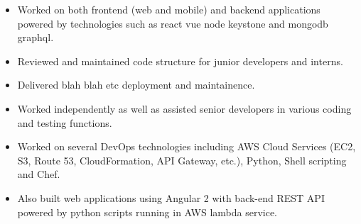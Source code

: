 \documentclass[10pt,a4paper,ragged2e]{altacv}
\begin{document}

\begin{fullwidth}
\makecvheader
\end{fullwidth}



\begin{itemize}
\item Worked on both frontend (web and mobile) and backend applications powered by technologies such as react vue node keystone and mongodb graphql.
\smallskip
\item Reviewed and maintained code structure for junior developers and interns. 
\smallskip
\item Delivered blah blah etc deployment and maintainence.
\end{itemize}

\divider

\begin{itemize}
\item Worked independently as well as assisted senior developers in various coding and testing functions. 
\smallskip
\item Worked on several DevOps technologies including AWS Cloud Services (EC2, S3, Route 53,
CloudFormation, API Gateway, etc.), Python, Shell scripting and Chef. 
\smallskip
\item Also built web applications using Angular 2 with back-end REST API powered by python scripts running in
AWS lambda service.
\end{itemize}
\end{document}
